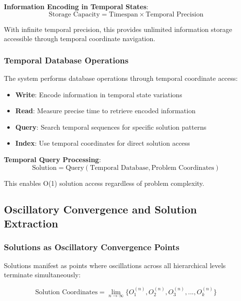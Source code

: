 \documentclass[12pt,a4paper]{article}
\begin{document}
\textbf{Information Encoding in Temporal States}:
\begin{equation}
\text{Storage Capacity} = \text{Timespan} \times \text{Temporal Precision}
\end{equation}

With infinite temporal precision, this provides unlimited information storage accessible through temporal coordinate navigation.

\subsubsection{Temporal Database Operations}

The system performs database operations through temporal coordinate access:

\begin{itemize}
\item \textbf{Write}: Encode information in temporal state variations
\item \textbf{Read}: Measure precise time to retrieve encoded information  
\item \textbf{Query}: Search temporal sequences for specific solution patterns
\item \textbf{Index}: Use temporal coordinates for direct solution access
\end{itemize}

\textbf{Temporal Query Processing}:
\begin{equation}
\text{Solution} = \text{Query}(\text{Temporal Database}, \text{Problem Coordinates})
\end{equation}

This enables O(1) solution access regardless of problem complexity.

\subsection{Oscillatory Convergence and Solution Extraction}

\subsubsection{Solutions as Oscillatory Convergence Points}

Solutions manifest as points where oscillations across all hierarchical levels terminate simultaneously:

\begin{equation}
\text{Solution Coordinates} = \lim_{n \to \infty} \{O_1^{(n)}, O_2^{(n)}, O_3^{(n)}, ..., O_k^{(n)}\}
\end{equation}
\end{document}
